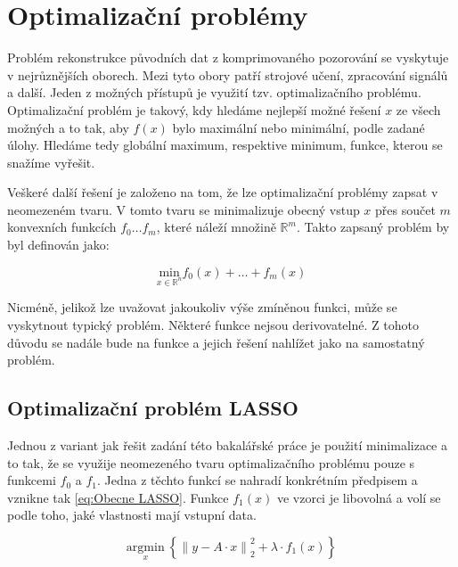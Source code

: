 \documentclass[FM,BP]{tulthesis}
\newcounter{Vzorce}
\begin{document}
\chapter{Optimalizační problémy}
\label{ch:optproblem}
Problém rekonstrukce původních dat z komprimovaného pozorování se vyskytuje v nejrůznějších oborech.  Mezi tyto obory patří strojové učení, zpracování signálů a další. Jeden z možných přístupů je využití tzv. optimalizačního problému. Optimalizační problém je takový, kdy hledáme nejlepší možné řešení $x$ ze všech možných a to tak, aby $f(x)$ bylo maximální nebo minimální, podle zadané úlohy. Hledáme tedy globální maximum, respektive minimum, funkce, kterou se snažíme vyřešit. 


Veškeré další řešení je založeno na tom, že lze optimalizační problémy zapsat v neomezeném tvaru. V tomto tvaru se minimalizuje obecný vstup $x$ přes součet $m$ konvexních funkcích $f_0 \ldots f_m$, které náleží množině $\mathbb{R}^m$. Takto zapsaný problém by byl definován jako:

\begin{equation} \label{eq:Obecny problem} \tag{Vzorec \theVzorce}
\underset{x \in \mathbb{R}^n} {\mathrm{min}} f_{0}(x)+\ldots+f_{m}(x)
\end{equation}

Nicméně, jelikož lze uvažovat jakoukoliv výše zmíněnou funkci, může se vyskytnout typický problém. Některé funkce nejsou derivovatelné. Z tohoto důvodu se nadále bude na funkce a jejich řešení nahlížet jako na samostatný problém.

\section{Optimalizační problém LASSO}
\label{subch:optLASSO}
Jednou z variant jak řešit zadání této bakalářské práce je použití minimalizace a to tak, že se využije neomezeného tvaru optimalizačního problému pouze s funkcemi $f_0$ a $f_1$. Jedna z těchto funkcí se nahradí konkrétním předpisem a vznikne tak \ref{eq:Obecne LASSO}. Funkce $f_1(x)$ ve vzorci je libovolná a volí se podle toho, jaké vlastnosti mají vstupní data. 

\begin{equation} \label{eq:Obecne LASSO} \tag{Vzorec \theVzorce}
\underset{x} {\mathrm{argmin}} ~\left\{\left\|y-A \cdot x\right\| ^2 _2+ \lambda \cdot f_1(x)\right\}
\end{equation}
\end{document}
